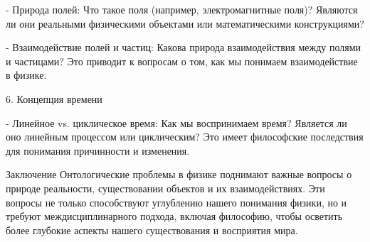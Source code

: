 \documentclass[exam_answers.tex]{subfiles}
\begin{document}
- Природа полей: Что такое поля (например, электромагнитные поля)? Являются ли они реальными физическими объектами или математическими конструкциями?

- Взаимодействие полей и частиц: Какова природа взаимодействия между полями и частицами? Это приводит к вопросам о том, как мы понимаем взаимодействие в физике.

6. Концепция времени

- Линейное vs. циклическое время: Как мы воспринимаем время? Является ли оно линейным процессом или циклическим? Это имеет философские последствия для понимания причинности и изменения.

Заключение
Онтологические проблемы в физике поднимают важные вопросы о природе реальности, существовании объектов и их взаимодействиях. Эти вопросы не только способствуют углублению нашего понимания физики, но и требуют междисциплинарного подхода, включая философию, чтобы осветить более глубокие аспекты нашего существования и восприятия мира.
\end{document}
